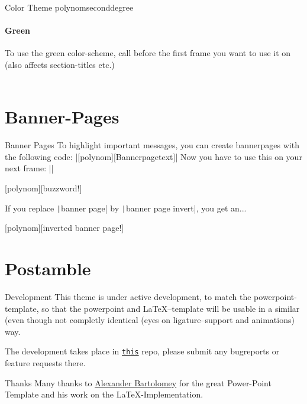 \documentclass[fragile=singleslide]{beamer}
\begin{document}
\setPaletteGreen
\begin{frame}{Color Theme polynomseconddegree}
  \framesubtitle{Green}

  To use the green color-scheme, call \texttt{\setPaletteGreen}
  before the first frame you want to use it on (also affects
  section-titles etc.) \\
  \paletteColors\\
  
\end{frame}
\setPaletteBlue

\section{Banner-Pages}
\begin{frame}{Banner Pages}
  To highlight important messages, you can create bannerpages with the
  following code:
  |[polynom][Bannerpagetext]|
  Now you have to use this on your next frame:
  ||
\end{frame}

[polynom][buzzword!]
\begin{frame}
\end{frame}

\begin{frame}
  If you replace \texttt|banner page| by
  \texttt|banner page invert|, you get an...
\end{frame}


[polynom][inverted banner page!]
\begin{frame}
\end{frame}


\section{Postamble}
\begin{frame}{Development}
  This theme is under active development, to match the
  powerpoint-template, so that the powerpoint and LaTeX--template will
  be usable in a similar (even though not completly identical (eyes on
  ligature--support and animations) way.

  The development takes place in
  \href{https://git.rwth-aachen.de/ACHinrichs/LaTeX-templates/}{\texttt{this}}
  repo, please submit any bugreports or feature requests there.
\end{frame}

\begin{frame}{Thanks}
  Many thanks to \href{https://www.occloxium.com/}{Alexander Bartolomey} for the great Power-Point
  Template and his work on the LaTeX-Implementation. 
\end{frame}
\end{document}
